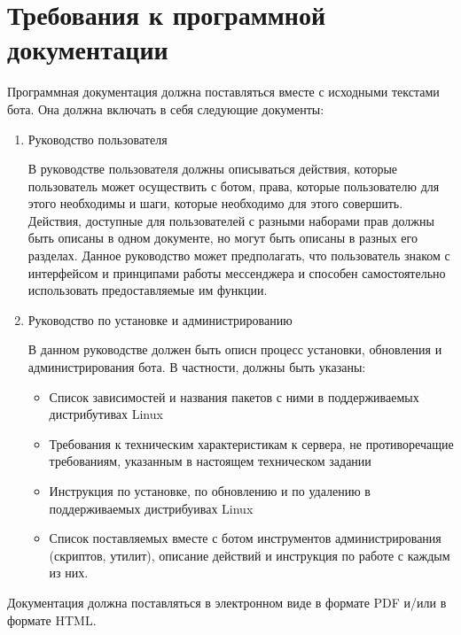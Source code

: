 \section{Требования к программной документации}
\label{sec:doc}
Программная документация должна поставляться вместе с исходными текстами бота.
Она должна включать в себя следующие документы:

\begin{enumerate}
    \item
        Руководство пользователя
        
        В руководстве пользователя должны описываться действия, которые пользователь может
        осуществить с ботом, права, которые пользователю для этого необходимы и шаги,
        которые необходимо для этого совершить. Действия, доступные для пользователей
        с разными наборами прав должны быть описаны в одном документе, но могут быть описаны
        в разных его разделах. Данное руководство может предполагать, что пользователь знаком
        с интерфейсом и принципами работы мессенджера и способен самостоятельно использовать
        предоставляемые им функции.

    \item
        Руководство по установке и администрированию

        В данном руководстве должен быть описн процесс установки, обновления и администрирования бота.
        В частности, должны быть указаны:
        \begin{itemize}
            \item
                Список зависимостей и названия пакетов с ними в поддерживаемых дистрибутивах Linux
            \item
                Требования к техническим характеристикам к сервера, не противоречащие требованиям,
                указанным в настоящем техническом задании
            \item
                Инструкция по установке, по обновлению и по удалению в поддерживаемых дистрибуивах Linux
            \item
                Список поставляемых вместе с ботом инструментов администрирования (скриптов, утилит),
                описание действий и инструкция по работе с каждым из них.
        \end{itemize}
\end{enumerate}

Документация должна поставляться в электронном виде в формате PDF и/или в формате HTML.
